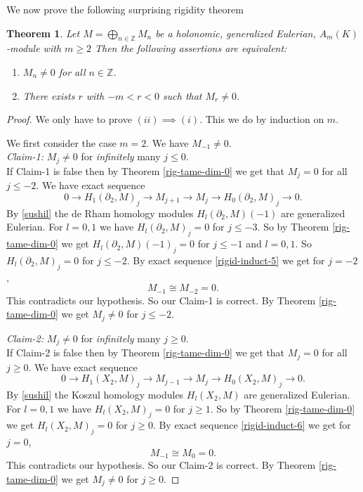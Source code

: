 \documentclass{amsart}
\newcommand{\ZZ}{\mathbb{Z} }
\newcommand{\rt}{\rightarrow}
\theoremstyle{plain}
\newtheorem{theorem}{Theorem}[section]
\theoremstyle{definition}
\theoremstyle{remark}
\begin{document}
 
 We now prove the following surprising rigidity theorem
 \begin{theorem}
  \label{rig-tame-suprise-dim-0}
  Let $M = \bigoplus_{n \in \ZZ} M_n$ be a holonomic, generalized Eulerian, $A_m(K)$-module with $m \geq 2$ Then 
   the following assertions are equivalent:
   \begin{enumerate}[\rm (i)]
    \item $M_n \neq 0$ for all  $n \in \ZZ $.
    \item There exists $r$  with $-m < r < 0$ such that $M_r \neq 0$. 
   \end{enumerate}
 \end{theorem}
 \begin{proof}
  We only have to prove $(ii) \implies (i)$. This we do by induction on $m$. 
  
  We first consider the case $m = 2$.  We have $M_{-1} \neq 0$.\\
  \textit{Claim-1:} $M_j \neq 0$ for \textit{infinitely} many $j \leq 0$.\\
  If Claim-1 is false then by Theorem \ref{rig-tame-dim-0} we get that $M_j  = 0$ for all $j \leq -2$.
  We have exact sequence
  \begin{equation}
  \label{rigid-induct-5}
  0 \rt H_1(\partial_2, M)_j \rt M_{j+1} \rt M_j \rt H_0(\partial_2, M)_j \rt 0.
 \end{equation}
 By \ref{sushil} the de Rham homology modules $H_l(\partial_2, M)(-1)$ are generalized Eulerian.
 For $l = 0, 1$ we have $H_l(\partial_2, M)_j = 0$  for $j \leq -3$. So by Theorem  \ref{rig-tame-dim-0} we get 
 $H_l(\partial_2, M)(-1)_j = 0$ for $j \leq -1$ and $l = 0, 1$. So $H_l(\partial_2, M)_j = 0$ for $j \leq -2$.
 By exact sequence \ref{rigid-induct-5} we get for $j = -2$,
 \[
  M_{-1} \cong M_{-2} = 0.
 \]
This contradicts our hypothesis. So our Claim-1 is correct. By Theorem \ref{rig-tame-dim-0}  we get $M_j \neq 0$ for $j \leq -2$.

\textit{Claim-2:} $M_j \neq 0$ for \textit{infinitely} many $j \geq 0$.\\
  If Claim-2 is false then by Theorem \ref{rig-tame-dim-0} we get that $M_j  = 0$ for all $j \geq 0$.
  We have exact sequence
  \begin{equation}
  \label{rigid-induct-6}
  0 \rt H_1(X_2, M)_j \rt M_{j-1} \rt M_j \rt H_0(X_2, M)_j \rt 0.
 \end{equation}
 By \ref{sushil} the Koszul homology modules $H_l(X_2, M)$ are generalized Eulerian.
 For $l = 0, 1$ we have $H_l(X_2, M)_j = 0$  for $j \geq 1$. So by Theorem  \ref{rig-tame-dim-0} we get 
 $H_l(X_2, M)_j = 0$ for $j \geq 0$. 
 By exact sequence \ref{rigid-induct-6} we get for $j = 0$,
 \[
  M_{-1} \cong M_0 = 0.
 \]
This contradicts our hypothesis. So our Claim-2 is correct.
By Theorem \ref{rig-tame-dim-0}  we get $M_j \neq 0$ for $j \geq 0$.


\end{proof}
\end{document}
